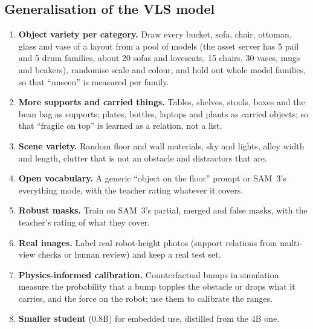 \documentclass[10pt,a4paper]{article}
\begin{document}
\subsection{Generalisation of the VLS model}
\begin{enumerate}
\item \textbf{Object variety per category.} Draw every bucket, sofa, chair, ottoman, glass and vase of a layout from a pool of
models (the asset server has 5 pail and 5 drum families, about 20 sofas and loveseats, 15 chairs, 30 vases, mugs and beakers),
randomise scale and colour, and hold out whole model families, so that ``unseen'' is measured per family.
\item \textbf{More supports and carried things.} Tables, shelves, stools, boxes and the bean bag as supports; plates, bottles,
laptops and plants as carried objects; so that ``fragile on top'' is learned as a relation, not a list.
\item \textbf{Scene variety.} Random floor and wall materials, sky and lights, alley width and length, clutter that is not an
obstacle and distractors that are.
\item \textbf{Open vocabulary.} A generic ``object on the floor'' prompt or SAM~3's everything mode, with the teacher rating
whatever it covers.
\item \textbf{Robust masks.} Train on SAM~3's partial, merged and false masks, with the teacher's rating of what they cover.
\item \textbf{Real images.} Label real robot-height photos (support relations from multi-view checks or human review) and keep a
real test set.
\item \textbf{Physics-informed calibration.} Counterfactual bumps in simulation measure the probability that a bump topples the
obstacle or drops what it carries, and the force on the robot; use them to calibrate the ranges.
\item \textbf{Smaller student} (0.8B) for embedded use, distilled from the 4B one.
\end{enumerate}

\appendix
\end{document}
